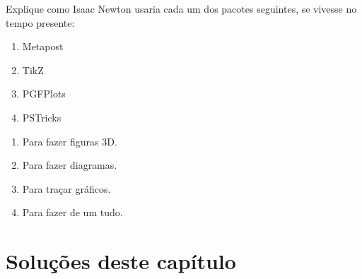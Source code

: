 \begin{question}
    Explique como Isaac Newton usaria cada um dos pacotes seguintes, se vivesse no tempo presente:
    \begin{enumerate}[label=(\Alph*)]
        \item Metapost
        \item TikZ
        \item PGFPlots
        \item PSTricks
    \end{enumerate}
\end{question}

\begin{solution}
    \begin{enumerate}[label=(\Alph*)]
        \item Para fazer figuras 3D.
        \item Para fazer diagramas.
        \item Para traçar gráficos.
        \item Para fazer de um tudo.
    \end{enumerate}
\end{solution}

\section{Soluções deste capítulo}

\printsolutions